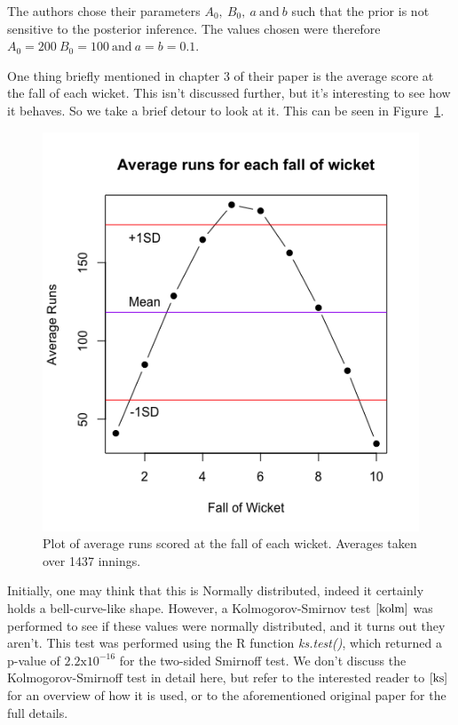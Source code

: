The authors chose their parameters $A_0, \ B_0, \ a \ \text{and} \ b$ such that the prior is not sensitive to the posterior inference. The values chosen
were therefore $A_0=200 \ B_0=100 \ \text{and} \ a=b=0.1$.

One thing briefly mentioned in chapter 3 of their paper is the average score at the fall of each wicket. This isn't discussed further, but it's interesting to see how it behaves.
So we take a brief detour to look at it. This can be seen in Figure~\ref{avgrunsfow}.

\begin{figure}[h]
    \centering
    \includegraphics[scale=0.6]{figures/avgrunsfow.png}
    \caption{Plot of average runs scored at the fall of each wicket. Averages taken over 1437 innings.}
    \label{avgrunsfow}
\end{figure}

Initially, one may think that this is Normally distributed, indeed it certainly holds a bell-curve-like shape. However, a Kolmogorov-Smirnov test $\cite{kolm}$ was
performed to see if these values were normally distributed, and it turns out they aren't. This test was performed using the R function \textit{ks.test()}, which returned
a p-value of $2.2\text{x}10^{-16}$ for the two-sided Smirnoff test. We don't discuss the Kolmogorov-Smirnoff test in detail here, but refer to the interested reader to $\cite{ks}$
for an overview of how it is used, or to the aforementioned original paper for the full details.  \\

